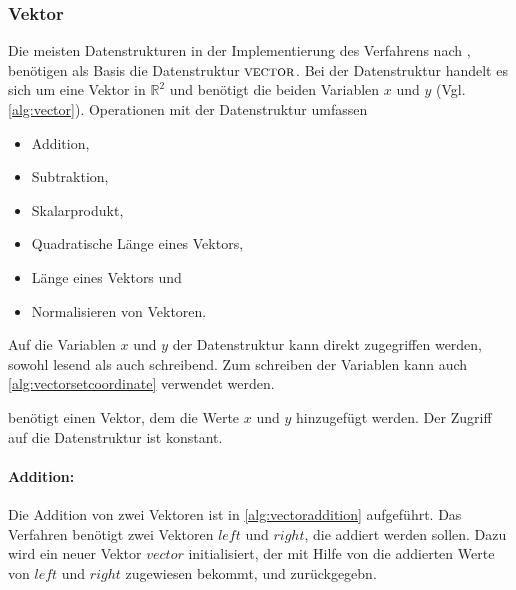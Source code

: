 \subsubsection{Vektor} %
\label{sub:vektor}

Die meisten Datenstrukturen in der Implementierung des Verfahrens nach \citeauthor{hirzer08}, benötigen als Basis die
 Datenstruktur $\textproc{vector}$. Bei der Datenstruktur handelt es sich um eine Vektor in $\mathbb{R}^2$ und benötigt
 die beiden Variablen $x$ und $y$ (Vgl. \autoref{alg:vector}). Operationen mit der Datenstruktur 
 umfassen

\begin{itemize}
	\item Addition,
	\item Subtraktion,
	\item Skalarprodukt,
	\item Quadratische Länge eines Vektors,
	\item Länge eines Vektors und
	\item Normalisieren von Vektoren.
\end{itemize}



Auf die Variablen $x$ und $y$ der Datenstruktur kann direkt zugegriffen werden, sowohl lesend als auch schreibend. Zum
 schreiben der Variablen kann auch \autoref{alg:vectorsetcoordinate} verwendet werden.



 benötigt einen Vektor, dem die Werte $x$ und $y$ hinzugefügt werden. Der Zugriff auf die
 Datenstruktur  ist konstant.

\paragraph{Addition:} %
\label{par:addition}

Die Addition von zwei Vektoren ist in \autoref{alg:vectoraddition} aufgeführt. Das Verfahren benötigt zwei Vektoren
 $\mathit{left}$ und $\mathit{right}$, die addiert werden sollen. Dazu wird ein neuer Vektor $\mathit{vector}$
 initialisiert, der mit Hilfe von  die addierten Werte von $\mathit{left}$ und
 $\mathit{right}$ zugewiesen bekommt, und zurückgegebn.



